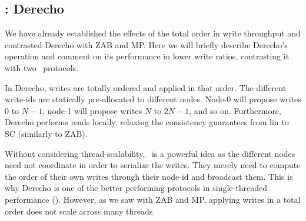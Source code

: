 \begin{comment}
\beginbsec{Summary}
In this section, we  have made the following observations. Firstly, total order hinders thread-scalability. 
Secondly, a low write throughput can prevent local reads from providing good performance even at low-write ratios.
Finally, we saw that passive followers are detrimental for performance.
Notably, these generic results hold for all classes.
\end{comment}
% 
% 
% 
% 



\subsection{\DTO: Derecho}\label{sec:ev:dto}
We have already established the effects of the total order in write throughput and contrasted Derecho with ZAB and MP. 
Here we will briefly describe Derecho's operation and comment on its performance in lower write ratios, contrasting it with two \DPKO~protocols.



In Derecho, writes are totally ordered and applied in that order. The different write-ids are statically pre-allocated to different nodes. Node-0 will propose writes $0$ to $N-1$, node-1 will propose writes $N$ to $2N - 1$, and so on.
Furthermore, Derecho performs reads locally, relaxing the consistency guarantees from lin to SC (similarly to ZAB). 

\begin{comment}
Let us now briefly discuss how we have implemented Derecho.
For each machine we pre-allocate a number of write-ids, in a round-robin fashion. A node's pre-allocated write-ids are again pre-allocated to the workers within it. Therefore, a worker need not synchronize with other workers to discover the next write-id it must use; rather it computes it from its own worker-id and node-id.
Similarly to ZAB, a write requires two broadcast rounds, a prepare and a commit. The receiver of a prepare responds with an ack (implemented with \odlib~ smart-acks). The receiver of a commit, which is also implemented with \odlib~smart-com, need not reply.
Finally, reads are implemented identically to ZAB.
\end{comment}
Without considering thread-scalability, \DTO\ is a powerful idea as the different nodes need not coordinate in order to serialize the writes. They merely need to compute the order of their own writes through their node-id and broadcast them.
This is why 
Derecho is one of the better performing protocols in single-threaded performance (). 
However, as we saw with ZAB and MP, applying writes in a total order does not scale across many threads.

